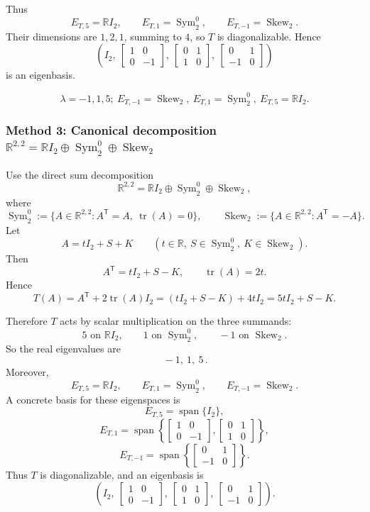 \documentclass[12pt]{article}
\newcommand{\R}{\mathbb{R}}
\newcommand{\Span}{\operatorname{span}}
\DeclareMathOperator{\tr}{tr}
\DeclareMathOperator{\Sym}{Sym}     %
\DeclareMathOperator{\Skew}{Skew}   %
\begin{document}
Thus
\[
E_{T,5}=\R I_2,\qquad
E_{T,1}=\Sym_2^0,\qquad
E_{T,-1}=\Skew_2.
\]
Their dimensions are $1,2,1$, summing to $4$, so $T$ is diagonalizable. Hence
\[
\left(
I_2,\
\begin{bmatrix}1&0\\0&-1\end{bmatrix},\
\begin{bmatrix}0&1\\1&0\end{bmatrix},\
\begin{bmatrix}0&1\\-1&0\end{bmatrix}
\right)
\]
is an eigenbasis.

\[
\boxed{\,\lambda=-1,1,5;\ E_{T,-1}=\Skew_2,\ E_{T,1}=\Sym_2^0,\ E_{T,5}=\R I_2.\,}
\]

\newpage
\subsubsection{Method 3: Canonical decomposition $\R^{2,2}=\R I_2\oplus \Sym_2^0\oplus \Skew_2$}

Use the direct sum decomposition
\[
\R^{2,2}=\R I_2\oplus \Sym_2^0\oplus \Skew_2,
\]
where
\[
\Sym_2^0:=\{A\in\R^{2,2}:A^{\mathsf T}=A,\ \tr(A)=0\},\qquad
\Skew_2:=\{A\in\R^{2,2}:A^{\mathsf T}=-A\}.
\]
Let
\[
A=tI_2+S+K
\qquad
(t\in\R,\ S\in\Sym_2^0,\ K\in\Skew_2).
\]
Then
\[
A^{\mathsf T}=tI_2+S-K,
\qquad
\tr(A)=2t.
\]
Hence
\[
T(A)=A^{\mathsf T}+2\tr(A)I_2
=(tI_2+S-K)+4tI_2
=5tI_2+S-K.
\]

Therefore \(T\) acts by scalar multiplication on the three summands:
\[
5 \text{ on } \R I_2,\qquad
1 \text{ on } \Sym_2^0,\qquad
-1 \text{ on } \Skew_2.
\]
So the real eigenvalues are
\[
\boxed{\, -1,\ 1,\ 5 \, }.
\]
Moreover,
\[
E_{T,5}=\R I_2,
\qquad
E_{T,1}=\Sym_2^0,
\qquad
E_{T,-1}=\Skew_2.
\]
A concrete basis for these eigenspaces is
\[
E_{T,5}=\Span\{I_2\},
\]
\[
E_{T,1}=
\Span\!\left\{
\begin{bmatrix}1&0\\0&-1\end{bmatrix},
\begin{bmatrix}0&1\\1&0\end{bmatrix}
\right\},
\]
\[
E_{T,-1}=
\Span\!\left\{
\begin{bmatrix}0&1\\-1&0\end{bmatrix}
\right\}.
\]
Thus \(T\) is diagonalizable, and an eigenbasis is
\[
\left(
I_2,\
\begin{bmatrix}1&0\\0&-1\end{bmatrix},\
\begin{bmatrix}0&1\\1&0\end{bmatrix},\
\begin{bmatrix}0&1\\-1&0\end{bmatrix}
\right).
\]
\end{document}
